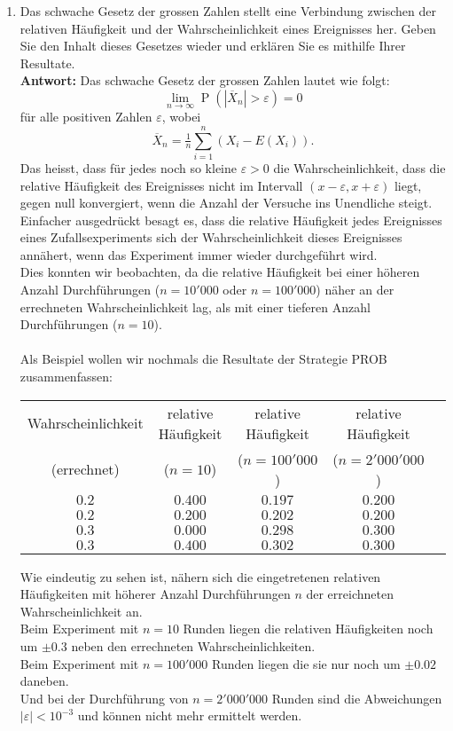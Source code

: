 \documentclass[12pt,a4paper]{article}
\begin{document}
\begin{enumerate}
\item Das schwache Gesetz der grossen Zahlen stellt eine Verbindung zwischen der relativen Häufigkeit und der Wahrscheinlichkeit eines Ereignisses her.
Geben Sie den Inhalt dieses Gesetzes wieder und erklären Sie es mithilfe Ihrer Resultate.\\
\textbf{Antwort:} Das schwache Gesetz der grossen Zahlen lautet wie folgt:
$$\lim_{n\rightarrow\infty}\operatorname{P}\left(\left|\overline{X}_n\right|>\varepsilon\right)=0$$
für alle positiven Zahlen $\varepsilon$, wobei
$$\overline{X}_n=\tfrac1n \textstyle\sum\limits_{i=1}^{n}(X_i-E ({X}_i)).$$
Das heisst, dass für jedes noch so kleine $\varepsilon > 0$ die Wahrscheinlichkeit, dass die relative Häufigkeit des Ereignisses nicht im Intervall $(x - \varepsilon, x + \varepsilon)$ liegt, gegen null konvergiert, wenn die Anzahl der Versuche ins Unendliche steigt.\\
Einfacher ausgedrückt besagt es, dass die relative Häufigkeit jedes Ereignisses eines Zufallsexperiments sich der Wahrscheinlichkeit dieses Ereignisses annähert, wenn das Experiment immer wieder durchgeführt wird.\\
Dies konnten wir beobachten, da die relative Häufigkeit bei einer höheren Anzahl Durchführungen ($n=10'000$ oder $n=100'000$) näher an der errechneten Wahrscheinlichkeit lag, als mit einer tieferen Anzahl Durchführungen ($n=10$).\\
\\
Als Beispiel wollen wir nochmals die Resultate der Strategie PROB zusammenfassen:\\
\begin{center}
\begin{tabular}{c|c c c c}
 Wahrscheinlichkeit & relative Häufigkeit & relative Häufigkeit & relative Häufigkeit\\
    (errechnet)     &       ($n=10$)      &    ($n=100'000$)    &   ($n=2'000'000$)  \\
       $0.2$        &       $0.400$       &       $0.197$       &       $0.200$      \\
       $0.2$        &       $0.200$       &       $0.202$       &       $0.200$      \\
       $0.3$        &       $0.000$       &       $0.298$       &       $0.300$      \\
       $0.3$        &       $0.400$       &       $0.302$       &       $0.300$
\end{tabular}
\end{center}
Wie eindeutig zu sehen ist, nähern sich die eingetretenen relativen Häufigkeiten mit höherer Anzahl Durchführungen $n$ der erreichneten Wahrscheinlichkeit an.\\
Beim Experiment mit $n=10$ Runden liegen die relativen Häufigkeiten noch um $\pm 0.3$ neben den errechneten Wahrscheinlichkeiten.\\
Beim Experiment mit $n=100'000$ Runden liegen die sie nur noch um $\pm 0.02$ daneben.\\
Und bei der Durchführung von $n=2'000'000$ Runden sind die Abweichungen $|\varepsilon|<10^{-3}$ und können nicht mehr ermittelt werden.
\newpage


\end{enumerate}
\end{document}
